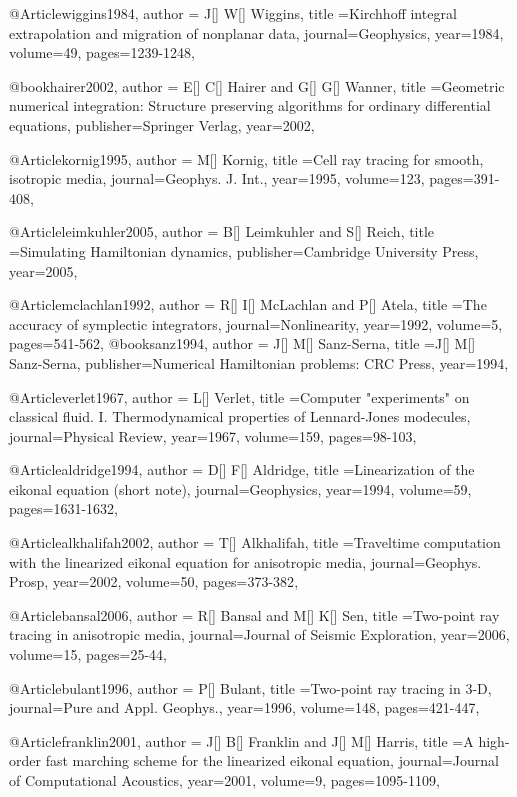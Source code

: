 {@Article{wiggins1984,
  author = {J[] W[] Wiggins},
  title ={Kirchhoff integral extrapolation and migration of nonplanar data},
  journal={Geophysics},
  year=1984,
  volume=49,
  pages={1239-1248},
}

@book{hairer2002,
  author = {E[] C[] Hairer and G[] G[] Wanner},
  title ={Geometric numerical integration: Structure preserving algorithms for ordinary differential equations},
  publisher={Springer Verlag},
  year=2002,
}

@Article{kornig1995,
  author = {M[] Kornig},
  title ={Cell ray tracing for smooth, isotropic media},
  journal={Geophys. J. Int.},
  year=1995,
  volume=123,
  pages={391-408},
}

@Article{leimkuhler2005,
  author = {B[] Leimkuhler and S[] Reich},
  title ={Simulating Hamiltonian dynamics},
  publisher={Cambridge University Press},
  year=2005,
}


@Article{mclachlan1992,
  author = {R[] I[] McLachlan and P[] Atela},
  title ={The accuracy of symplectic integrators},
  journal={Nonlinearity},
  year=1992,
  volume=5,
  pages={541-562},
}
@book{sanz1994,
  author = {J[] M[] Sanz-Serna},
  title ={J[] M[] Sanz-Serna},
  publisher={Numerical Hamiltonian problems: CRC Press},
  year=1994,
}

@Article{verlet1967,
  author = {L[] Verlet},
  title ={Computer "experiments" on classical fluid. I. Thermodynamical properties of Lennard-Jones modecules},
  journal={Physical Review},
  year=1967,
  volume=159,
  pages={98-103},
}


@Article{aldridge1994,
  author = {D[] F[] Aldridge},
  title ={Linearization of the eikonal equation (short note)},
  journal={Geophysics},
  year=1994,
  volume=59,
  pages={1631-1632},
}

@Article{alkhalifah2002,
  author = {T[] Alkhalifah},
  title ={Traveltime computation with the linearized eikonal equation for anisotropic media},
  journal={Geophys. Prosp},
  year=2002,
  volume=50,
  pages={373-382},
}

@Article{bansal2006,
  author = {R[] Bansal and M[] K[] Sen},
  title ={Two-point ray tracing in anisotropic media},
  journal={Journal of Seismic Exploration},
  year=2006,
  volume=15,
  pages={25-44},
}

@Article{bulant1996,
  author = {P[] Bulant},
  title ={Two-point ray tracing in 3-D},
  journal={Pure and Appl. Geophys.},
  year=1996,
  volume=148,
  pages={421-447},
}


@Article{franklin2001,
  author = {J[] B[] Franklin and J[] M[] Harris},
  title ={A high-order fast marching scheme for the linearized eikonal equation},
  journal={Journal of Computational Acoustics},
  year=2001,
  volume=9,
  pages={1095-1109},
}

}
